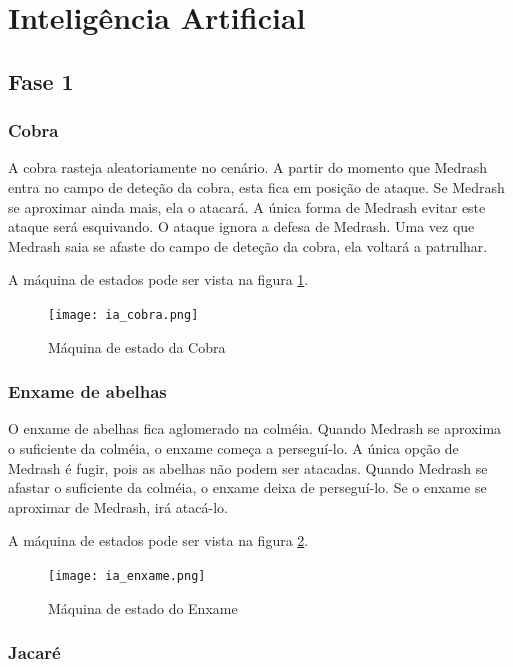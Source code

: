 \section{Inteligência Artificial}

\subsection{Fase 1}

\subsubsection{Cobra}

A cobra rasteja aleatoriamente no cenário. A partir do momento que
Medrash entra no campo de deteção da cobra, esta fica em posição
de ataque. Se Medrash se aproximar ainda mais, ela o atacará.
A única forma de Medrash evitar este ataque será esquivando. O ataque
ignora a defesa de Medrash.
Uma vez que Medrash saia se afaste do campo de deteção da cobra, ela
voltará a patrulhar.

A máquina de estados pode ser vista na figura \ref{fsm:cobra}.

\begin{figure}[!ht]
 \centering
 \texttt{[image: ia\_cobra.png]}
 \caption{Máquina de estado da Cobra}
 \label{fsm:cobra}
\end{figure}

\subsubsection{Enxame de abelhas}

O enxame de abelhas fica aglomerado na colméia. Quando Medrash se
aproxima o suficiente da colméia, o enxame começa a perseguí-lo.
A única opção de Medrash é fugir, pois as abelhas não podem ser atacadas.
Quando Medrash se afastar o suficiente da colméia, o enxame deixa
de perseguí-lo.
Se o enxame se aproximar de Medrash, irá atacá-lo.

A máquina de estados pode ser vista na figura \ref{fsm:enxame}.

\begin{figure}[!ht]
 \centering
 \texttt{[image: ia\_enxame.png]}
 \caption{Máquina de estado do Enxame}
 \label{fsm:enxame}
\end{figure}

\subsubsection{Jacaré}

